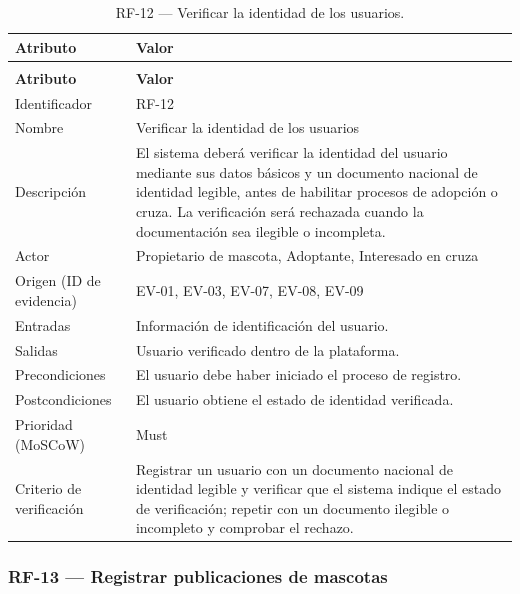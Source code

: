 \documentclass[journal,onecolumn]{IEEEtran}
\makeatletter
\newenvironment{atributos}[2]{%
	\small
	\begin{longtable}{@{}>{\raggedright\arraybackslash}p{4.2cm} >{\raggedright\arraybackslash}p{11.2cm}@{}}
		\caption{#2}\label{tab:#1}\\
		\toprule
		\textbf{Atributo} & \textbf{Valor} \\
		\midrule
		\endfirsthead
		\multicolumn{2}{@{}l}{\small\itshape (continuación)}\\
		\toprule
		\textbf{Atributo} & \textbf{Valor} \\
		\midrule
		\endhead
		\bottomrule
		\endlastfoot
	}{%
	\end{longtable}
	\normalsize
}
\makeatother
\begin{document}
	\begin{atributos}{RF-12}{RF-12 --- Verificar la identidad de los usuarios.}
		Identificador & RF-12 \\
		Nombre & Verificar la identidad de los usuarios \\
		Descripción & El sistema deberá verificar la identidad del usuario mediante sus datos básicos y un documento nacional de identidad legible, antes de habilitar procesos de adopción o cruza. La verificación será rechazada cuando la documentación sea ilegible o incompleta. \\
		Actor & Propietario de mascota, Adoptante, Interesado en cruza \\
		Origen (ID de evidencia) & EV-01, EV-03, EV-07, EV-08, EV-09 \\
		Entradas & Información de identificación del usuario. \\
		Salidas & Usuario verificado dentro de la plataforma. \\
		Precondiciones & El usuario debe haber iniciado el proceso de registro. \\
		Postcondiciones & El usuario obtiene el estado de identidad verificada. \\
		Prioridad (MoSCoW) & Must \\
		Criterio de verificación & Registrar un usuario con un documento nacional de identidad legible y verificar que el sistema indique el estado de verificación; repetir con un documento ilegible o incompleto y comprobar el rechazo. \\
	\end{atributos}
	
	\subsubsection{RF-13 --- Registrar publicaciones de mascotas}
	
\end{document}
